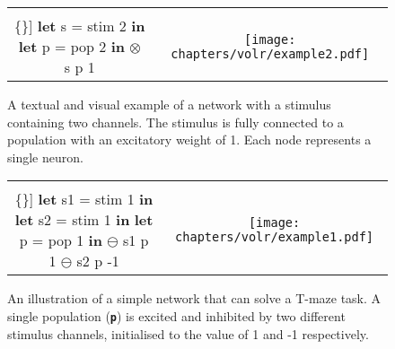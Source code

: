 \begin{figure}
  \ContinuedFloat*
  \begin{tabular}[t]{c c}
    \begin{minipage}{0.5\textwidth}
      \begin{Verbatim}[mathescape,commandchars=\\\{\}]
\textbf{let} s = stim 2 \textbf{in}
  \textbf{let} p = pop 2 \textbf{in}
      $\otimes$ s p 1
      \end{Verbatim}
    \end{minipage} & \begin{minipage}{0.5\textwidth}
      \texttt{[image: chapters/volr/example2.pdf]}
    \end{minipage}

  \end{tabular}
  \caption{A textual and visual example of a network
    with a stimulus containing two channels. 
    The stimulus is fully connected to a population with an excitatory
    weight of 1. Each node represents a single neuron.}
  \label{fig:volr-example1}
\end{figure}

\begin{figure}
  \ContinuedFloat
  \begin{tabular}[t]{c c}
    \begin{minipage}{0.5\textwidth}
      \begin{Verbatim}[mathescape,commandchars=\\\{\}]
\textbf{let} s1 = stim 1 \textbf{in}
  \textbf{let} s2 = stim 1 \textbf{in}
    \textbf{let} p = pop 1 \textbf{in}
      $\ominus$ s1 p 1
      $\ominus$ s2 p -1
      \end{Verbatim}
    \end{minipage} & \begin{minipage}{0.5\textwidth}
      \texttt{[image: chapters/volr/example1.pdf]}
    \end{minipage}
  \end{tabular}
  \caption{An illustration of a simple network that can solve a
    T-maze task. A single population (\texttt{\textbf{p}}) is 
    excited and inhibited by two different stimulus channels, initialised
    to the value of 1 and -1 respectively.}
  \label{fig:volr-example2}
\end{figure}

